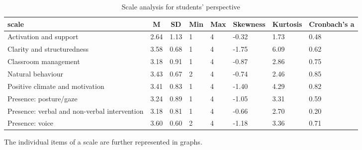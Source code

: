 \documentclass[
  english,
  man,floatsintext]{apa6}
\begin{document}
\begin{table}[h]

\begin{center}
\begin{threeparttable}

\caption{\label{tab:table-all-scales-students}Scale analysis for students' perspective}

\small{

\begin{tabular}{llllllll}
\toprule
scale & \multicolumn{1}{c}{M} & \multicolumn{1}{c}{SD} & \multicolumn{1}{c}{Min} & \multicolumn{1}{c}{Max} & \multicolumn{1}{c}{Skewness} & \multicolumn{1}{c}{Kurtosis} & \multicolumn{1}{c}{Cronbach's a}\\
\midrule
Activation and support & 2.64 & 1.13 & 1 & 4 & -0.32 & 1.73 & 0.48\\
Clarity and structuredness & 3.58 & 0.68 & 1 & 4 & -1.75 & 6.09 & 0.62\\
Classroom management & 3.18 & 0.91 & 1 & 4 & -0.87 & 2.86 & 0.75\\
Natural behaviour & 3.43 & 0.67 & 2 & 4 & -0.74 & 2.46 & 0.85\\
Positive climate and motivation & 3.41 & 0.83 & 1 & 4 & -1.40 & 4.29 & 0.82\\
Presence: posture/gaze & 3.24 & 0.89 & 1 & 4 & -1.05 & 3.31 & 0.59\\
Presence: verbal and non-verbal intervention & 3.18 & 0.81 & 1 & 4 & -0.66 & 2.70 & 0.20\\
Presence: voice & 3.60 & 0.60 & 2 & 4 & -1.18 & 3.36 & 0.71\\
\bottomrule
\end{tabular}

}

\end{threeparttable}
\end{center}

\end{table}

\newpage

The individual items of a scale are further represented in graphs.
\end{document}
